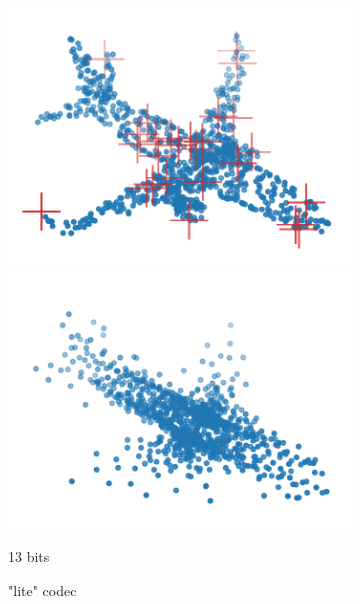 \begin{figure}[t]
\begin{subfigure}[b]{\subfigureouterhspace}
\begin{subsubfigure}[b]{\subfigurehspace}
      \includegraphics[width=\linewidth]{img/point_cloud_compression/crit/test_airplane_0630/lite_1.pdf}
      \includegraphics[width=\linewidth]{img/point_cloud_compression/rec/test_airplane_0630/lite_1.pdf}
      \caption{13 bits}
      \label{fig:rec/lite/1}
    \end{subsubfigure}%
    \caption{"lite" codec}
  \end{subfigure}%
  \par%
  \vspace{1\baselineskip}%
  \begin{subfigure}[b]{\subfigureouterhspace}
    \setcounter{subsubfigure}{0}
    \centering
    \begin{subsubfigure}[b]{\subfigurehspace}

\end{subsubfigure}
\end{subfigure}
\end{figure}
